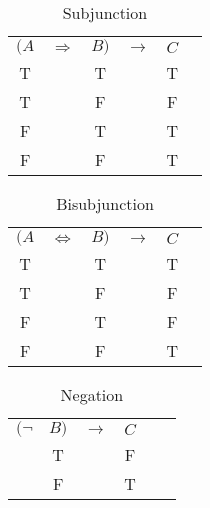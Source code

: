\begin{table}[hbt!]
    \centering
    \begin{tabular}{*{6}{c}}
        $(A$ & $\Rightarrow$ & $B)$ & $\rightarrow$ & $C$ \\
           T &               & T    &               & T   \\
           T &               & F    &               & F   \\
           F &               & T    &               & T   \\
           F &               & F    &               & T   \\
    \end{tabular}
    \caption{Subjunction}\label{table-subjunction}
\end{table}

\begin{table}[hbt!]
    \centering
    \begin{tabular}{*{6}{c}}
        $(A$ & $\Leftrightarrow$ & $B)$ & $\rightarrow$ & $C$ \\
           T &                   & T    &               & T   \\
           T &                   & F    &               & F   \\
           F &                   & T    &               & F   \\
           F &                   & F    &               & T   \\
    \end{tabular}
    \caption{Bisubjunction}\label{table-bisubjunction}
\end{table}

\begin{table}[hbt!]
    \centering
    \begin{tabular}{*{6}{c}}
        $(\neg$ & $B)$ & $\rightarrow$ & $C$ \\
                & T    &               & F   \\
                & F    &               & T   \\
    \end{tabular}
    \caption{Negation}\label{table-negation}
\end{table}


